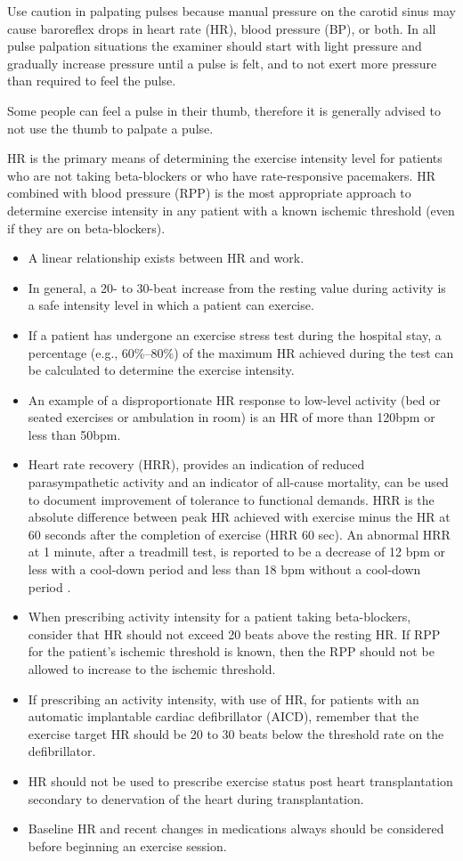 Use caution in palpating pulses because manual pressure on the carotid sinus may cause baroreflex drops in heart rate (HR), blood pressure (BP), or both. In all pulse palpation situations the examiner should start with light pressure and gradually increase pressure until a pulse is felt, and to not exert more pressure than required to feel the pulse.

Some people can feel a pulse in their thumb, therefore it is generally advised to not use the thumb to palpate a pulse.

HR is the primary means of determining the exercise intensity level for patients who are not taking beta-blockers or who have rate-responsive pacemakers. HR combined with blood pressure (RPP) is the most appropriate approach to determine exercise intensity in any patient with a known ischemic threshold (even if they are on beta-blockers).

\begin{itemize}
\item A linear relationship exists between HR and work.
\item In general, a 20- to 30-beat increase from the resting value during activity is a safe intensity level in which a patient can exercise.
\item If a patient has undergone an exercise stress test during the hospital stay, a percentage (e.g., 60\%–80\%) of the maximum HR achieved during the test can be calculated to determine the exercise intensity.
\item An example of a disproportionate HR response to low-level activity (bed or seated exercises or ambulation in room) is an HR of more than 120bpm or less than 50bpm.
\item Heart rate recovery (HRR), provides an indication of reduced parasympathetic activity and an indicator of all-cause mortality, can be used to document improvement of tolerance to functional demands. HRR is the absolute difference between peak HR achieved with exercise minus the HR at 60 seconds after the completion of exercise (HRR 60 sec).  An abnormal HRR at 1 minute, after a treadmill test, is reported to be a decrease of 12 bpm or less with a cool-down period and less than 18 bpm without a cool-down period \cite{collins_cardiac_2019}.
\item When prescribing activity intensity for a patient taking beta-blockers, consider that HR should not exceed 20 beats above the resting HR. If RPP for the patient's ischemic threshold is known, then the RPP should not be allowed to increase to the ischemic threshold.
\item If prescribing an activity intensity, with use of HR, for patients with an automatic implantable cardiac defibrillator (AICD), remember that the exercise target HR should be 20 to 30 beats below the threshold rate on the defibrillator.
\item HR should not be used to prescribe exercise status post heart transplantation secondary to denervation of the heart during transplantation.
\item Baseline HR and recent changes in medications always should be considered before beginning an exercise session.
\end{itemize}

